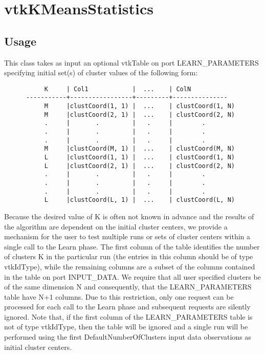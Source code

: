 \section{vtkKMeansStatistics}

\subsection{Usage}

 This class takes as input an optional vtkTable on port LEARN\_PARAMETERS 
 specifying initial  set(s) of cluster values of the following form:  
 \begin{verbatim}
           K     | Col1            |  ...    | ColN    
      -----------+-----------------+---------+---------------
           M     |clustCoord(1, 1) |  ...    | clustCoord(1, N)
           M     |clustCoord(2, 1) |  ...    | clustCoord(2, N)
           .     |       .         |   .     |        .
           .     |       .         |   .     |        .
           .     |       .         |   .     |        .
           M     |clustCoord(M, 1) |  ...    | clustCoord(M, N)
           L     |clustCoord(1, 1) |  ...    | clustCoord(1, N)
           L     |clustCoord(2, 1) |  ...    | clustCoord(2, N)
           .     |       .         |   .     |        .
           .     |       .         |   .     |        .
           .     |       .         |   .     |        .
           L     |clustCoord(L, 1) |  ...    | clustCoord(L, N)
 \end{verbatim}

 Because the desired value of K is often not known in advance and the 
 results of the algorithm are dependent on the initial cluster centers, 
 we provide a mechanism for the user to test multiple runs or sets of cluster centers
 within a single call to the Learn phase.  The first column of the table identifies 
 the number of clusters K in the particular run (the entries in this column should be 
 of type vtkIdType), while the remaining columns are a 
 subset of the columns contained in the table on port INPUT\_DATA.  We require that 
 all user specified clusters be of the same dimension N and consequently, that the 
 LEARN\_PARAMETERS table have N+1 columns. Due to this restriction, only one request
 can be processed for each call to the Learn phase and subsequent requests are 
 silently ignored. Note that, if the first column of the LEARN\_PARAMETERS table is not 
 of type vtkIdType, then the table will be ignored and a single run will be performed using
 the first DefaultNumberOfClusters input data observations as initial cluster centers.

